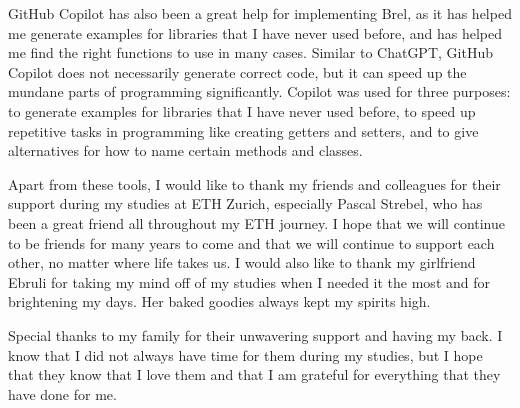GitHub Copilot has also been a great help for implementing Brel, 
as it has helped me generate examples for libraries that I have never used before,
and has helped me find the right functions to use in many cases.
Similar to ChatGPT, GitHub Copilot does not necessarily generate correct code, 
but it can speed up the mundane parts of programming significantly.
Copilot was used for three purposes: to generate examples for libraries that I have never used before, 
to speed up repetitive tasks in programming like creating getters and setters, 
and to give alternatives for how to name certain methods and classes.

Apart from these tools, I would like to thank my friends and colleagues for their support during my studies at ETH Zurich,
especially Pascal Strebel, who has been a great friend all throughout my ETH journey.
I hope that we will continue to be friends for many years to come and that we will continue to support each other, no matter where life takes us.
I would also like to thank my girlfriend Ebruli for taking my mind off of my studies when I needed it the most and
for brightening my days. 
Her baked goodies always kept my spirits high.

Special thanks to my family for their unwavering support and having my back.
I know that I did not always have time for them during my studies, 
but I hope that they know that I love them and that I am grateful for everything that they have done for me.

